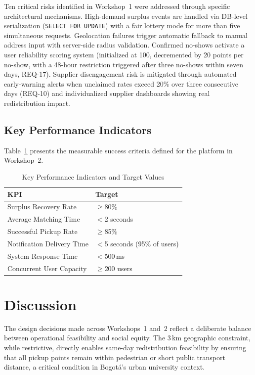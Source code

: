 \documentclass[conference]{IEEEtran}
\begin{document}
Ten critical risks identified in Workshop~1 were addressed through specific architectural mechanisms. High-demand surplus events are handled via DB-level serialization (\texttt{SELECT FOR UPDATE}) with a fair lottery mode for more than five simultaneous requests. Geolocation failures trigger automatic fallback to manual address input with server-side radius validation. Confirmed no-shows activate a user reliability scoring system (initialized at 100, decremented by 20 points per no-show, with a 48-hour restriction triggered after three no-shows within seven days, REQ-17). Supplier disengagement risk is mitigated through automated early-warning alerts when unclaimed rates exceed 20\% over three consecutive days (REQ-10) and individualized supplier dashboards showing real redistribution impact.

\subsection{Key Performance Indicators}

Table~\ref{tab:kpis} presents the measurable success criteria defined for the platform in Workshop~2.

\begin{table}[H]
\centering
\caption{Key Performance Indicators and Target Values}
\label{tab:kpis}
\begin{tabular}{|p{3.5cm}|p{4cm}|}
\hline
\textbf{KPI} & \textbf{Target} \\
\hline
Surplus Recovery Rate & $\geq$80\% \\
\hline
Average Matching Time & $<$2 seconds \\
\hline
Successful Pickup Rate & $\geq$85\% \\
\hline
Notification Delivery Time & $<$5 seconds (95\% of users) \\
\hline
System Response Time & $<$500\,ms \\
\hline
Concurrent User Capacity & $\geq$200 users \\
\hline
\end{tabular}
\end{table}

\section{Discussion}

The design decisions made across Workshops~1 and~2 reflect a deliberate balance between operational feasibility and social equity. The 3\,km geographic constraint, while restrictive, directly enables same-day redistribution feasibility by ensuring that all pickup points remain within pedestrian or short public transport distance, a critical condition in Bogotá's urban university context.
\end{document}
